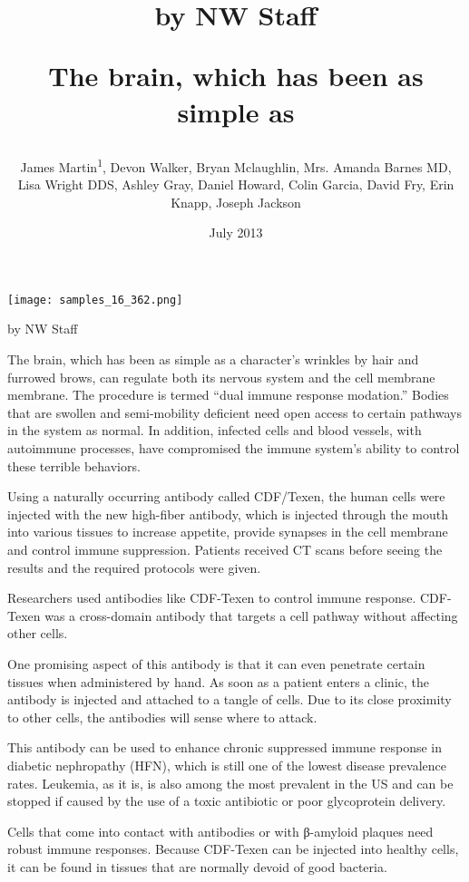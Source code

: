 \documentclass{article}
\title{by NW Staff

The brain, which has been as simple as}
\author{James Martin\textsuperscript{1},  Devon Walker,  Bryan Mclaughlin,  Mrs. Amanda Barnes MD,  Lisa Wright DDS,  Ashley Gray,  Daniel Howard,  Colin Garcia,  David Fry,  Erin Knapp,  Joseph Jackson}
\affil{\textsuperscript{1}Minjiang University}
\date{July 2013}
\begin{document}
\maketitle

\begin{center}
\begin{minipage}{0.75\linewidth}
\texttt{[image: samples\_16\_362.png]}
\end{minipage}
\end{center}

by NW Staff

The brain, which has been as simple as a character’s wrinkles by hair and furrowed brows, can regulate both its nervous system and the cell membrane membrane. The procedure is termed “dual immune response modation.” Bodies that are swollen and semi-mobility deficient need open access to certain pathways in the system as normal. In addition, infected cells and blood vessels, with autoimmune processes, have compromised the immune system’s ability to control these terrible behaviors.

Using a naturally occurring antibody called CDF/Texen, the human cells were injected with the new high-fiber antibody, which is injected through the mouth into various tissues to increase appetite, provide synapses in the cell membrane and control immune suppression. Patients received CT scans before seeing the results and the required protocols were given.

Researchers used antibodies like CDF-Texen to control immune response. CDF-Texen was a cross-domain antibody that targets a cell pathway without affecting other cells.

One promising aspect of this antibody is that it can even penetrate certain tissues when administered by hand. As soon as a patient enters a clinic, the antibody is injected and attached to a tangle of cells. Due to its close proximity to other cells, the antibodies will sense where to attack.

This antibody can be used to enhance chronic suppressed immune response in diabetic nephropathy (HFN), which is still one of the lowest disease prevalence rates. Leukemia, as it is, is also among the most prevalent in the US and can be stopped if caused by the use of a toxic antibiotic or poor glycoprotein delivery.

Cells that come into contact with antibodies or with β-amyloid plaques need robust immune responses. Because CDF-Texen can be injected into healthy cells, it can be found in tissues that are normally devoid of good bacteria.
\end{document}
